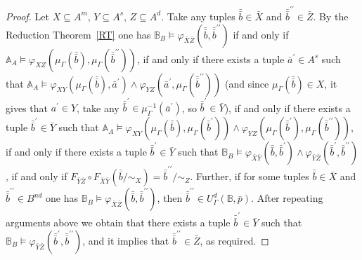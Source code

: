 \documentclass[12pt]{article}
\theoremstyle{definition}
\def\MA{{\mathbb{A}}}
\def\MB{{\mathbb{B}}}
\begin{document}
\begin{proof}
Let $X\subseteq A^m$, $Y\subseteq A^s$, $Z\subseteq A^d$. Take any tuples $\bar{\bar b}\in \bar X$ and $\bar{\bar b}^{\prime\prime}\in \bar Z$. By the Reduction Theorem~\ref{RT} one has $\MB_B\models \varphi_{\bar X \bar Z}(\bar{\bar b}, \bar{\bar b}^{\prime\prime})$ if and only if $\MA_A\models \varphi_{ X  Z}(\mu_\Gamma(\bar{\bar b}), \mu_\Gamma(\bar{\bar b}^{\prime\prime}))$, if and only if there exists a tuple $\bar a^\prime\in A^s$ such that $\MA_A\models \varphi_{XY}(\mu_\Gamma(\bar{\bar b}),\bar a^\prime) \wedge \varphi_{YZ}(\bar a^\prime,\mu_\Gamma(\bar{\bar b}^{\prime\prime}))$ (and since $\mu_\Gamma(\bar{\bar b})\in X$, it gives that $a^\prime\in Y$, take any $\bar{\bar b}^\prime\in \mu_\Gamma^{-1}(\bar a^\prime)$, so $\bar{\bar b}^\prime\in \bar Y$), if and only if there exists a tuple $\bar{\bar b}^\prime\in \bar Y$ such that $\MA_A\models \varphi_{XY}(\mu_\Gamma(\bar{\bar b}),\mu_\Gamma(\bar{\bar b}^{\prime})) \wedge \varphi_{YZ}(\mu_\Gamma(\bar{\bar b}^{\prime}),\mu_\Gamma(\bar{\bar b}^{\prime\prime}))$, if and only if there exists a tuple $\bar{\bar b}^\prime\in \bar Y$ such that $\MB_B\models \varphi_{\bar X \bar Y}(\bar{\bar b},\bar{\bar b}^{\prime}) \wedge \varphi_{\bar Y \bar Z}(\bar{\bar b}^{\prime},\bar{\bar b}^{\prime\prime})$, if and only if $F_{\bar Y \bar Z}\circ F_{\bar X \bar Y}(\bar{\bar b}/{\sim_X})=\bar{\bar b}^{\prime\prime}/{\sim_Z}$. Further, if for some tuples $\bar{\bar b}\in \bar X$ and $\bar{\bar b}^{\prime\prime}\in B^{nd}$ one has $\MB_B\models \varphi_{\bar X \bar Z}(\bar{\bar b}, \bar{\bar b}^{\prime\prime})$, then  $\bar{\bar b}^{\prime\prime}\in U_\Gamma^{d}(\MB,\bar p)$. After repeating arguments above we obtain that there exists a tuple $\bar{\bar b}^\prime\in \bar Y$ such that $\MB_B\models  \varphi_{\bar Y \bar Z}(\bar{\bar b}^{\prime},\bar{\bar b}^{\prime\prime})$, and it implies that $\bar{\bar b}^{\prime\prime}\in \bar Z$, as required.  
\end{proof}
\end{document}
